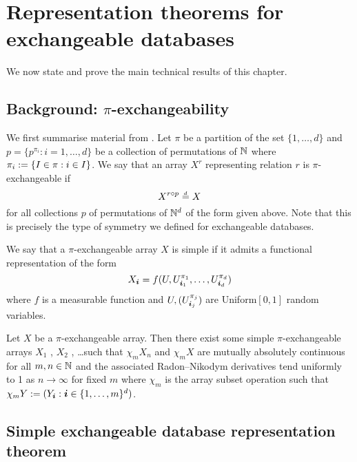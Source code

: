 \section{Representation theorems for exchangeable databases}
\label{sec:proof_database}

We now state and prove the main technical results of this chapter.

\subsection{Background: $\pi$-exchangeability}

We first summarise material from \citet{Kallenberg1999-pj}.
Let $\pi$ be a partition of the set $\{1,\dots,d\}$ and $p = \{p^{\pi_i} : i = 1,\dots,d\}$ be a collection of permutations of $\mathbb{N}$ where $\pi_i := \{I \in \pi : i \in I\}$.
We say that an array $X^r$ representing relation $r$ is $\pi$-exchangeable if 
\begin{equation}
  X^{r\circ p} \overset{\,_{\!d}}{=} X
\end{equation}
for all collections $p$ of permutations of $\mathbb{N}^d$ of the form given above.
Note that this is precisely the type of symmetry we defined for exchangeable databases.

We say that a $\pi$-exchangeable array $X$ is simple if it admits a functional representation of the form
\begin{equation}
  X_{\bm{i}} = f(U, U^{\pi_1}_{\bm{i}_1}, \dots, U^{\pi_d}_{\bm{i}_d})
\end{equation}
where $f$ is a measurable function and $U, (U^{\pi_j}_{\bm{i}_j})$ are \iid Uniform$[0,1]$ random variables.

\begin{prop}
  \label{thm:piex}
  Let $X$ be a $\pi$-exchangeable array.
  Then there exist some simple $\pi$-exchangeable arrays $X_1$ , $X_2$ , \dots such that
  $\chi_m X_n$ and $\chi_m X$ are mutually absolutely continuous for all $m,n \in \mathbb{N}$ and the associated Radon--Nikodym derivatives tend
  uniformly to 1 as $n \to \infty$ for fixed $m$ where $\chi_m$ is the array subset operation such that $\chi_m Y := (Y_{\bm{i}} : \bm{i} \in \{1,\dots,m\}^d)$.
\end{prop}

\subsection{Simple exchangeable database representation theorem}

